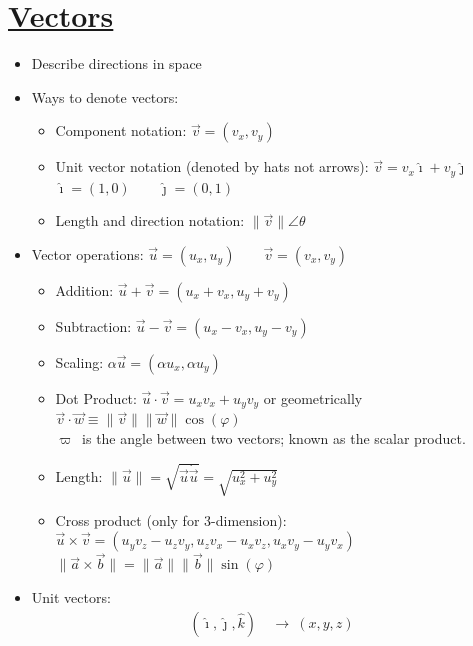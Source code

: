 \documentclass{article}
\begin{document}
\section{\underline{Vectors}}
\begin{itemize}
  \item Describe directions in space
  \item Ways to denote vectors:
  \begin{itemize}
    \item Component notation: $\vec{v} = (v_{x}, v_{y})$
    \item Unit vector notation (denoted by hats not arrows): $\vec{v} = v_{x}\hat{\imath} + v_{y}\hat{\jmath}$\\
    $\hat{\imath} = (1,0)\qquad \hat{\jmath} = (0,1)$
    \item Length and direction notation: $\|\vec{v}\|\angle\theta$
  \end{itemize}
  \item Vector operations: $\vec{u} = (u_{x}, u_{y})\qquad \vec{v} = (v_{x}, v_{y})$
  \begin{itemize}
    \item Addition: $\vec{u} + \vec{v} = (u_{x} + v_{x}, u_{y} + v_{y})$
    \item Subtraction: $\vec{u} - \vec{v} = (u_{x} - v_{x}, u_{y} - v_{y})$
    \item Scaling: $\alpha\vec{u} = (\alpha u_{x}, \alpha u_{y})$
    \item Dot Product: $\vec{u} \cdot \vec{v} = u_{x}v_{x} + u_{y}v_{y}$ or geometrically\\
    $\vec{v}\cdot\vec{w} \equiv \|\vec{v}\|\|\vec{w}\|\cos(\varphi)$\\
    $\varpi$\ is the angle between two vectors; known as the scalar product.
    \item Length: $\|\vec{u}\| = \sqrt{\vec{u}\dot\vec{u}} = \sqrt{u^{2}_{x} + u^{2}_{y}}$
    \item Cross product (only for 3-dimension): $\vec{u}\times\vec{v} = (u_{y}v_{z} - u_{z}v_{y}, u_{z}v_{x} - u_{x}v_{z}, u_{x}v_{y} - u_{y}v_{x})$\\
    $\|\vec{a} \times \vec{b}\| = \|\vec{a}\|\|\vec{b}\|\sin(\varphi)$
  \end{itemize}
  \item Unit vectors:
  \begin{align*}
    (\hat{\imath},\hat{\jmath},\hat{k})\ &\rightarrow\ (x,y,z)\\

\end{align*}
\end{itemize}
\end{document}
